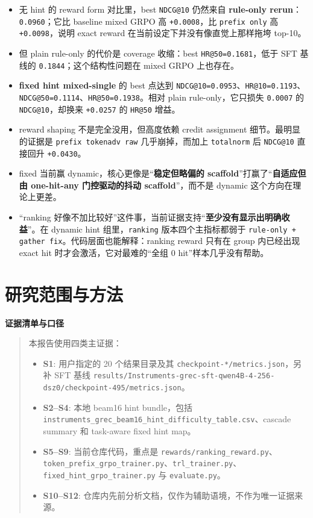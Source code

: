 \documentclass[a4paper]{article}
\newenvironment{methodbox}[1]{\par\medskip\noindent\textbf{#1}\par\begin{quote}}{\end{quote}\medskip}
\begin{document}
\begin{itemize}
\item 无 hint 的 reward form 对比里，best \texttt{NDCG@10} 仍然来自 \textbf{rule-only rerun}：\texttt{0.0960}；它比 baseline mixed GRPO 高 \texttt{+0.0008}，比 \texttt{prefix only} 高 \texttt{+0.0098}，说明 exact reward 在当前设定下并没有像直觉上那样拖垮 top-10。
\item 但 plain rule-only 的代价是 coverage 收缩：best \texttt{HR@50=0.1681}，低于 SFT 基线的 \texttt{0.1844}；这个结构性问题在 mixed GRPO 上也存在。
\item \textbf{fixed hint mixed-single} 的 best 点达到 \texttt{NDCG@10=0.0953}、\texttt{HR@10=0.1193}、\texttt{NDCG@50=0.1114}、\texttt{HR@50=0.1938}。相对 plain rule-only，它只损失 \texttt{0.0007} 的 \texttt{NDCG@10}，却换来 \texttt{+0.0257} 的 \texttt{HR@50} 增益。
\item reward shaping 不是完全没用，但高度依赖 credit assignment 细节。最明显的证据是 \texttt{prefix tokenadv raw} 几乎崩掉，而加上 \texttt{totalnorm} 后 \texttt{NDCG@10} 直接回升 \texttt{+0.0430}。
\item fixed 当前赢 dynamic，核心更像是“\textbf{稳定但略偏的 scaffold}”打赢了“\textbf{自适应但由 one-hit-any 门控驱动的抖动 scaffold}”，而不是 dynamic 这个方向在理论上更差。
\item “ranking 好像不加比较好”这件事，当前证据支持“\textbf{至少没有显示出明确收益}”。在 dynamic hint 组里，\texttt{ranking} 版本四个主指标都弱于 \texttt{rule-only + gather fix}。代码层面也能解释：ranking reward 只有在 group 内已经出现 exact hit 时才会激活，它对最难的“全组 0 hit”样本几乎没有帮助。
\end{itemize}

\section{研究范围与方法}

\begin{methodbox}{证据清单与口径}
本报告使用四类主证据：
\begin{itemize}
\item \textbf{S1}: 用户指定的 20 个结果目录及其 \texttt{checkpoint-*/metrics.json}，另补 SFT 基线 \texttt{results/Instruments-grec-sft-qwen4B-4-256-dsz0/checkpoint-495/metrics.json}。
\item \textbf{S2--S4}: 本地 beam16 hint bundle，包括 \texttt{instruments\_grec\_beam16\_hint\_difficulty\_table.csv}、cascade summary 和 task-aware fixed hint map。
\item \textbf{S5--S9}: 当前仓库代码，重点是 \texttt{rewards/ranking\_reward.py}、\texttt{token\_prefix\_grpo\_trainer.py}、\texttt{trl\_trainer.py}、\texttt{fixed\_hint\_grpo\_trainer.py} 与 \texttt{evaluate.py}。
\item \textbf{S10--S12}: 仓库内先前分析文档，仅作为辅助语境，不作为唯一证据来源。
\end{itemize}
\end{methodbox}
\end{document}
